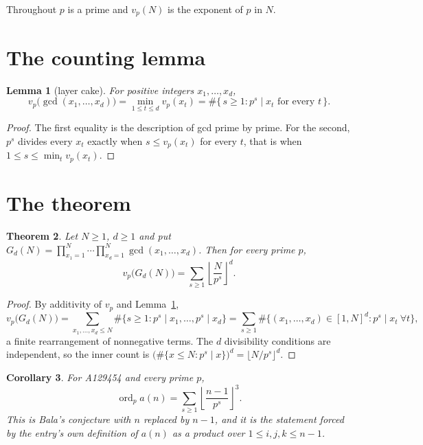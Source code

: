 \documentclass[11pt,a4paper]{article}
\theoremstyle{plain}
\newtheorem{theorem}{Theorem}
\newtheorem{lemma}[theorem]{Lemma}
\newtheorem{corollary}[theorem]{Corollary}
\theoremstyle{definition}
\begin{document}
Throughout $p$ is a prime and $v_{p}(N)$ is the exponent of $p$ in $N$.

\section{The counting lemma}

\begin{lemma}[layer cake]\label{lem:layer}
For positive integers $x_{1},\dots,x_{d}$,
\[
  v_{p}\bigl(\gcd(x_{1},\dots,x_{d})\bigr)=\min_{1\le t\le d}v_{p}(x_{t})
  =\#\bigl\{\,s\ge1:p^{s}\mid x_{t}\text{ for every }t\,\bigr\}.
\]
\end{lemma}

\begin{proof}
The first equality is the description of gcd prime by prime. For the second, $p^{s}$
divides every $x_{t}$ exactly when $s\le v_{p}(x_{t})$ for every $t$, that is when
$1\le s\le\min_{t}v_{p}(x_{t})$.
\end{proof}

\section{The theorem}

\begin{theorem}\label{thm:main}
Let $N\ge1$, $d\ge1$ and put
$G_{d}(N)=\prod_{x_{1}=1}^{N}\cdots\prod_{x_{d}=1}^{N}\gcd(x_{1},\dots,x_{d})$. Then for
every prime $p$,
\[
  v_{p}\bigl(G_{d}(N)\bigr)=\sum_{s\ge1}\left\lfloor\frac{N}{p^{s}}\right\rfloor^{d}.
\]
\end{theorem}

\begin{proof}
By additivity of $v_{p}$ and Lemma~\ref{lem:layer},
\[
  v_{p}\bigl(G_{d}(N)\bigr)=\sum_{x_{1},\dots,x_{d}\le N}
  \#\{s\ge1:p^{s}\mid x_{1},\dots,p^{s}\mid x_{d}\}
  =\sum_{s\ge1}\#\bigl\{(x_{1},\dots,x_{d})\in[1,N]^{d}:p^{s}\mid x_{t}\ \forall t\bigr\},
\]
a finite rearrangement of nonnegative terms. The $d$ divisibility conditions are
independent, so the inner count is
$\bigl(\#\{x\le N:p^{s}\mid x\}\bigr)^{d}=\lfloor N/p^{s}\rfloor^{d}$.
\end{proof}

\begin{corollary}\label{cor:main}
For A129454 and every prime $p$,
\[
  \operatorname{ord}_{p}a(n)=\sum_{s\ge1}\left\lfloor\frac{n-1}{p^{s}}\right\rfloor^{3}.
\]
This is Bala's conjecture with $n$ replaced by $n-1$, and it is the statement forced by the
entry's own definition of $a(n)$ as a product over $1\le i,j,k\le n-1$.
\end{corollary}
\end{document}
